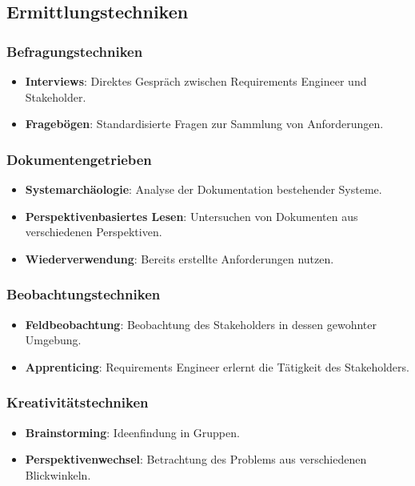 \documentclass[11pt, a4paper]{article}
\begin{document}
\subsection{Ermittlungstechniken}

\subsubsection*{Befragungstechniken}
\begin{itemize}
    \item \textbf{Interviews}: Direktes Gespräch zwischen Requirements Engineer und Stakeholder.
    \item \textbf{Fragebögen}: Standardisierte Fragen zur Sammlung von Anforderungen.
\end{itemize}

\subsubsection*{Dokumentengetrieben}
\begin{itemize}
    \item \textbf{Systemarchäologie}: Analyse der Dokumentation bestehender Systeme.
    \item \textbf{Perspektivenbasiertes Lesen}: Untersuchen von Dokumenten aus verschiedenen Perspektiven.
    \item \textbf{Wiederverwendung}: Bereits erstellte Anforderungen nutzen.
\end{itemize}

\subsubsection*{Beobachtungstechniken}
\begin{itemize}
    \item \textbf{Feldbeobachtung}: Beobachtung des Stakeholders in dessen gewohnter Umgebung.
    \item \textbf{Apprenticing}: Requirements Engineer erlernt die Tätigkeit des Stakeholders.
\end{itemize}

\subsubsection*{Kreativitätstechniken}
\begin{itemize}
    \item \textbf{Brainstorming}: Ideenfindung in Gruppen.
    \item \textbf{Perspektivenwechsel}: Betrachtung des Problems aus verschiedenen Blickwinkeln.
\end{itemize}
\end{document}
